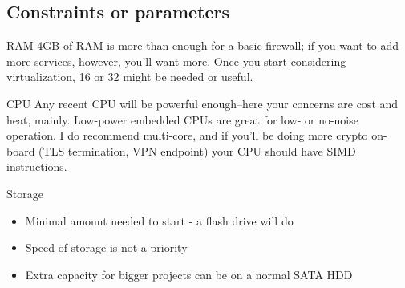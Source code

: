 \documentclass[bigger]{beamer}
\begin{document}
\subsection{Constraints or parameters}
\label{sec:org9880863}

\begin{frame}[label={sec:org4c417ad}]{RAM}
4GB of RAM is more than enough for a basic firewall; if you want to add more
services, however, you'll want more. Once you start considering
virtualization, 16 or 32 might be needed or useful.
\end{frame}

\begin{frame}[label={sec:org5a31146}]{CPU}
Any recent CPU will be powerful enough--here your concerns are cost and
heat, mainly. Low-power embedded CPUs are great for low- or no-noise
operation. I do recommend multi-core, and if you'll be doing more crypto
on-board (TLS termination, VPN endpoint) your CPU should have SIMD
instructions.
\end{frame}

\begin{frame}[label={sec:org7599d13}]{Storage}
  \begin{itemize}
  \item<2-> Minimal amount needed to start - a flash drive will do
  \item<3-> Speed of storage is not a priority
  \item<4-> Extra capacity for bigger projects can be on a normal SATA HDD
  \end{itemize}
\end{frame}
\end{document}
